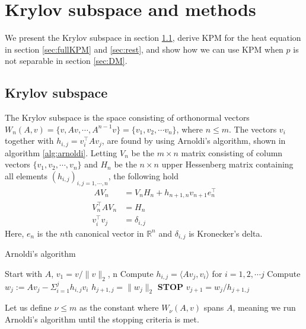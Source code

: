 \chapter{Krylov subspace and methods}%
We present the Krylov subspace in section \ref{sec:subspace}, derive KPM for the heat equation in section \ref{sec:fullKPM} and \ref{sec:rest}, and show how we can use KPM when $p$ is not separable in section \ref{sec:DM}.
\label{sec:krylov}

\section{Krylov subspace} \label{sec:subspace}
The Krylov subspace is the space consisting of orthonormal vectors $W_n (A,v) = \{v,Av, \cdots, A^{n-1}v\} = \{v_1,v_2,\cdots v_n\} $, where $n \leq m$. %
The vectors $v_i$ together with $h_{i,j} = v_i^\top Av_j$, are found by using Arnoldi's algorithm, shown in algorithm \ref{alg:arnoldi}. Letting $V_n$ be the $m \times n$ matrix consisting of column vectors $\{v_1,v_2,\cdots,v_n \}$ and $H_n$ be the $n \times n$ upper Hessenberg matrix containing all elements $(h_{i,j})_{i,j=1,\cdots,n}$, the following hold \cite{krylovprop}
\begin{align}\
AV_n & = V_n H_n + h_{n+1,n}v_{n+1}e^\top_n \label{eqn:prop1} \\
V^{\top}_n AV_n &= H_n \label{eqn:prop2} \\
v_i^{\top} v_j &= \delta_{i,j} \label{eqn:prop3}
\end{align}
Here, $e_n$ is the $n$th canonical vector in $\mathbb{R}^n$ and $\delta_{i,j}$ is Kronecker's delta.\\




\begin{algorithm} 
\begin{algorithmic} \caption{\cite{arnold}Arnoldi's algorithm} \label{alg:arnoldi}  
\STATE Start with $A$, $v_1 = v/\|v \|_2$, n
   \STATE Compute $h_{i,j} = \langle Av_j,v_i \rangle $ for $i = 1,2,\cdots j$
    \STATE Compute $w_j := A v_j - \Sigma_{i=1}^{j} h_{i,j}v_i $
    \STATE $h_{j+1,j} = \| w_j \|_2$
        \STATE\textbf{STOP}
    \ENDIF 
   \STATE $v_{j+1} = w_j/h_{j+1,j}$
\ENDFOR
\end{algorithmic} 
\end{algorithm}
Let us define $\nu  \leq m$ as the constant where $W_\nu(A,v)$ spans $A$, meaning we run Arnoldi's algorithm until the stopping criteria is met.
